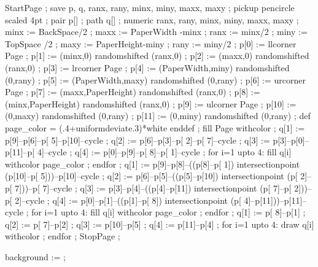     StartPage ;
        save p, q, ranx, rany, minx, miny, maxx, maxy ;
        pickup pencircle scaled 4pt ;
        pair p[] ; path q[] ; numeric ranx, rany, minx, miny, maxx, maxy ;
        minx := BackSpace/2 ; maxx := PaperWidth -minx ; ranx := minx/2 ;
        miny := TopSpace /2 ; maxy := PaperHeight-miny ; rany := miny/2 ;
        p[0]  := llcorner Page ;
        p[1]  := (minx,0)           randomshifted (ranx,0) ;
        p[2]  := (maxx,0)           randomshifted (ranx,0) ;
        p[3]  := lrcorner Page ;
        p[4]  := (PaperWidth,miny)  randomshifted (0,rany) ;
        p[5]  := (PaperWidth,maxy)  randomshifted (0,rany) ;
        p[6]  := urcorner Page ;
        p[7]  := (maxx,PaperHeight) randomshifted (ranx,0) ;
        p[8]  := (minx,PaperHeight) randomshifted (ranx,0) ;
        p[9]  := ulcorner Page ;
        p[10] := (0,maxy)           randomshifted (0,rany) ;
        p[11] := (0,miny)           randomshifted (0,rany) ;
        def page_color = (.4+uniformdeviate.3)*white enddef ;
        fill Page  withcolor  ;
        q[1] := p[9]--p[6]--p[ 5]--p[10]--cycle ;
        q[2] := p[6]--p[3]--p[ 2]--p[ 7]--cycle ;
        q[3] := p[3]--p[0]--p[11]--p[ 4]--cycle ;
        q[4] := p[0]--p[9]--p[ 8]--p[ 1]--cycle ;
        for i=1 upto 4: fill q[i] withcolor page_color ; endfor ;
        q[1] := p[9]--p[8]--((p[8]--p[ 1]) intersectionpoint (p[10]--p[ 5]))--p[10]--cycle ;
        q[2] := p[6]--p[5]--((p[5]--p[10]) intersectionpoint (p[ 2]--p[ 7]))--p[ 7]--cycle ;
        q[3] := p[3]--p[4]--((p[4]--p[11]) intersectionpoint (p[ 7]--p[ 2]))--p[ 2]--cycle ;
        q[4] := p[0]--p[1]--((p[1]--p[ 8]) intersectionpoint (p[ 4]--p[11]))--p[11]--cycle ;
        for i=1 upto 4: fill q[i] withcolor page_color ; endfor ;
        q[1] := p[ 8]--p[1] ;
        q[2] := p[ 7]--p[2] ;
        q[3] := p[10]--p[5] ;
        q[4] := p[11]--p[4] ;
        for i=1 upto 4: draw q[i] withcolor  ; endfor ;
    StopPage ;
\stopuseMPgraphic


\setupbackgrounds
  [page]
  [background={PageFrame,backgraphics,foreground,foregraphics}]


\startMPinclusions
    background :=  ;
\stopMPinclusions

\stopenvironment
